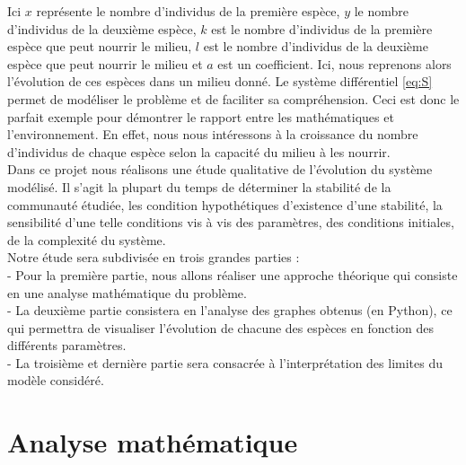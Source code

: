 \documentclass{article}
\begin{document}
Ici $x$ représente le nombre d’individus de la première espèce, $y$ le nombre d’individus de la
deuxième espèce, $k$ est le nombre d’individus de la première espèce que peut nourrir le milieu, $l$ est le nombre d’individus de la deuxième espèce que peut nourrir le milieu et $a$ est un coefficient. Ici, nous reprenons alors l'évolution de ces espèces dans un milieu donné. Le système différentiel \eqref{eq:S} permet de modéliser le problème et de faciliter sa compréhension. Ceci est donc le parfait exemple pour démontrer le rapport entre les mathématiques et l'environnement. En effet, nous nous intéressons à la croissance du nombre d'individus de chaque espèce selon la capacité du milieu à les nourrir.\\

Dans ce projet nous réalisons une étude qualitative de l’évolution du système modélisé. Il s’agit la plupart du temps de déterminer la stabilité de la communauté étudiée, les condition hypothétiques d’existence d’une stabilité, la sensibilité d’une telle conditions vis à vis des paramètres, des conditions initiales, de la complexité du système.\\

Notre étude sera subdivisée en trois grandes parties :\\

- Pour la première partie, nous allons réaliser une approche théorique qui consiste en une analyse mathématique du problème. \\

- La deuxième partie consistera en l'analyse des graphes obtenus (en Python), ce qui permettra de visualiser l'évolution de chacune des espèces en fonction des différents paramètres.\\

- La troisième et dernière partie sera consacrée à l'interprétation des limites du modèle considéré.



\newpage

\setcounter{secnumdepth}{2}
\section{Analyse mathématique}
\end{document}

